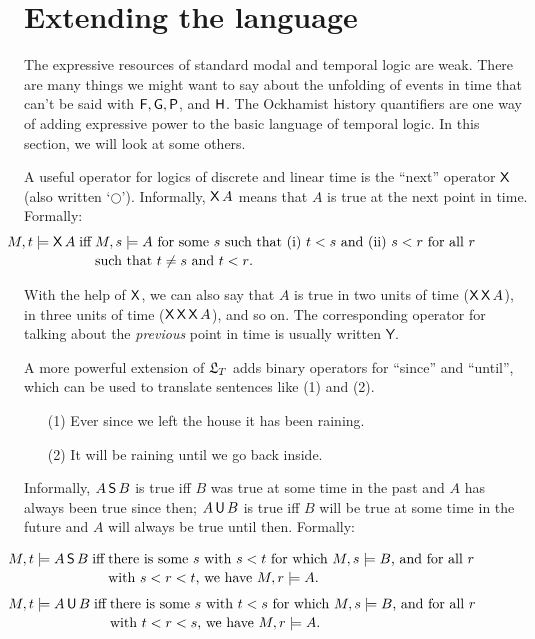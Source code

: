 \section{Extending the language}\label{sec:2d}

The expressive resources of standard modal and temporal logic are weak. There
are many things we might want to say about the unfolding of events in time that
can't be said with $\operatorname{\mathsf{F}}, \operatorname{\mathsf{G}}, \operatorname{\mathsf{P}}$, and $\operatorname{\mathsf{H}}$. The Ockhamist history quantifiers
are one way of adding expressive power to the basic language of temporal logic.
In this section, we will look at some others.

A useful operator for logics of discrete and linear time is the ``next''
operator $\operatorname{\mathsf{X}}$ (also written `$\bigcirc$'). Informally, $\operatorname{\mathsf{X}} A$ means that $A$
is true at the next point in time. Formally:
%
\begin{align*}
\hspace{-17mm}
  M,t \models \tX A \;\text{iff} & \;\text{$M,s \models A$ for some $s$ such that (i) $t<s$ and (ii) $s<r$ for all $r$}\\[-0.5mm]
  & \;\text{such that $t\not=s$ and $t<r$.}
\end{align*}

With the help of $\operatorname{\mathsf{X}}$, we can also say that $A$ is true in two units of time
($\operatorname{\mathsf{X}}\operatorname{\mathsf{X}} A$), in three units of time ($\operatorname{\mathsf{X}}\operatorname{\mathsf{X}}\operatorname{\mathsf{X}} A$), and so on. The
corresponding operator for talking about the \emph{previous} point in time is
usually written $\mathsf{Y}$.

A more powerful extension of $\mathfrak{L}_T$ adds binary operators for ``since'' and
``until'', which can be used to translate sentences like (1) and (2).
%
\begin{itemize}[leftmargin=10mm]
  \itemsep-1mm
\item[(1)] Ever since we left the house it has been raining.
\item[(2)] It will be raining until we go back inside.
\end{itemize}
%
Informally, $A\operatorname{\mathsf{S}} B$ is true iff $B$ was true at some time in the past and $A$
has always been true since then; $A \operatorname{\mathsf{U}} B$ is true iff $B$ will be true at some
time in the future and $A$ will always be true until then. Formally:

\vspace{-5mm}
\begin{align*}
  \hspace{-17mm}
  M,t \models A \tS B \;\text{iff} &\; \text{there is some $s$ with $s < t$ for which $M,s \models B$, and for all $r$}\\[-0.5mm]
                                    &\;\text{with $s < r < t$, we have $M, r \models A$.}
\end{align*}
\vspace{-12mm}
\begin{align*}
  \hspace{-17mm}
M,t \models A \tU B \;\text{iff} &\; \text{there is some $s$ with $t < s$ for which $M,s \models B$, and for all $r$}\\[-0.5mm]
  &\;\text{with $t < r < s$, we have $M, r \models A$.}
\end{align*}

